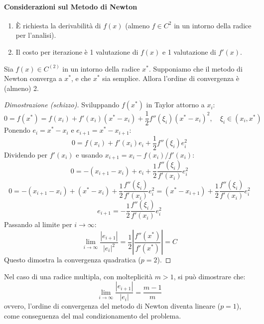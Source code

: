 \paragraph{Considerazioni sul Metodo di Newton}
\begin{enumerate}
    \item È richiesta la derivabilità di $f(x)$ (almeno $f \in C^2$ in un intorno della radice per l'analisi).
    \item Il costo per iterazione è 1 valutazione di $f(x)$ e 1 valutazione di $f'(x)$.
\end{enumerate}

\begin{teorema}
    Sia $f(x) \in C^{(2)}$ in un intorno della radice $x^*$. Supponiamo che il metodo di Newton converga a $x^*$, e che $x^*$ sia semplice. Allora l'ordine di convergenza è (almeno) 2.
\end{teorema}
\begin{proof}[Dimostrazione (schizzo)]
Sviluppando $f(x^*)$ in Taylor attorno a $x_i$:
$$ 0 = f(x^*) = f(x_i) + f'(x_i)(x^* - x_i) + \frac{1}{2} f''(\xi_i)(x^* - x_i)^2, \quad \xi_i \in (x_i, x^*) $$
Ponendo $e_i = x^* - x_i$ e $e_{i+1} = x^* - x_{i+1}$:
$$ 0 = f(x_i) + f'(x_i)e_i + \frac{1}{2} f''(\xi_i)e_i^2 $$
Dividendo per $f'(x_i)$ e usando $x_{i+1} = x_i - f(x_i)/f'(x_i)$:
$$ 0 = -(x_{i+1} - x_i) + e_i + \frac{1}{2} \frac{f''(\xi_i)}{f'(x_i)} e_i^2 $$
$$ 0 = -(x_{i+1} - x_i) + (x^* - x_i) + \frac{1}{2} \frac{f''(\xi_i)}{f'(x_i)} e_i^2 = (x^* - x_{i+1}) + \frac{1}{2} \frac{f''(\xi_i)}{f'(x_i)} e_i^2 $$
$$ e_{i+1} = - \frac{1}{2} \frac{f''(\xi_i)}{f'(x_i)} e_i^2 $$
Passando al limite per $i \to \infty$:
$$ \lim_{i \to \infty} \frac{|e_{i+1}|}{|e_i|^2} =  \frac{1}{2} \left|\frac{f''(x^*)}{f'(x^*)} \right| = C $$
Questo dimostra la convergenza quadratica ($p=2$).
\end{proof}

\begin{osservazione}
    Nel caso di una radice multipla, con molteplicità $m > 1$, si può dimostrare che:
    $$ \lim_{i \to \infty} \frac{|e_{i+1}|}{|e_i|} = \frac{m-1}{m} $$
    ovvero, l'ordine di convergenza del metodo di Newton diventa lineare ($p=1$), come conseguenza del mal condizionamento del problema.
    \end{osservazione}